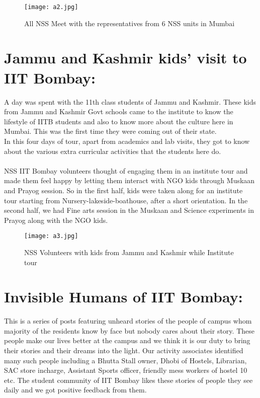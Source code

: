 \begin{figure}[H]
\centering
\texttt{[image: a2.jpg]}
\caption*{All NSS Meet with the representatives from 6 NSS units in Mumbai}
\end{figure}

\section*{ Jammu and Kashmir kids’ visit to IIT Bombay:} A day was spent with the 11th class students of Jammu and Kashmir.
These kids from Jammu and Kashmir Govt schools came to the institute to know the
lifestyle of IITB students and also to know more about the culture
here in Mumbai. This was the first time they were coming out of their
state. \\
  In this four days of tour, apart from academics and lab visits, they
got to know about the various extra curricular activities that
the students here do.\\ \\
    NSS IIT Bombay volunteers thought of engaging them in an institute tour
and made them feel happy by letting them interact with NGO kids
through Muskaan and Prayog session. So in the first half, kids were taken along
for an institute tour starting from Nursery-lakeside-boathouse, after a
short orientation. In the second half, we had Fine arts session in the
Muskaan and Science experiments in Prayog along with the NGO kids.
\begin{figure}[H]
\centering
\texttt{[image: a3.jpg]}
\caption*{NSS Volunteers with kids from Jammu and Kashmir while Institute tour
}
\end{figure}

\section*{ Invisible Humans of IIT Bombay:} This is a series of posts featuring unheard stories of the people of campus whom majority of the residents know by face but nobody cares about their story. These people make our lives better at the campus and we think it is our duty to bring their stories and their dreams into the light. Our activity associates identified many such people including a Bhutta Stall owner, Dhobi of Hostels, Librarian, SAC store incharge, Assistant Sports officer, friendly mess workers of hostel 10 etc. The student community of IIT Bombay likes these stories of people they see daily and we got positive feedback from them.

